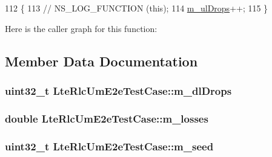 \begin{DoxyCode}
112 \{
113   \textcolor{comment}{// NS\_LOG\_FUNCTION (this);}
114   \hyperlink{classLteRlcUmE2eTestCase_aba1374edf326035c3804c471cbb844a0}{m\_ulDrops}++;
115 \}
\end{DoxyCode}


Here is the caller graph for this function\+:




\subsection{Member Data Documentation}
\subsubsection[{\texorpdfstring{m\+\_\+dl\+Drops}{m_dlDrops}}]{\setlength{\rightskip}{0pt plus 5cm}uint32\+\_\+t Lte\+Rlc\+Um\+E2e\+Test\+Case\+::m\+\_\+dl\+Drops\hspace{0.3cm}{\ttfamily [private]}}\hypertarget{classLteRlcUmE2eTestCase_a11acb19c786aa57d6ce8bdf86e75d79f}{}\label{classLteRlcUmE2eTestCase_a11acb19c786aa57d6ce8bdf86e75d79f}
\subsubsection[{\texorpdfstring{m\+\_\+losses}{m_losses}}]{\setlength{\rightskip}{0pt plus 5cm}double Lte\+Rlc\+Um\+E2e\+Test\+Case\+::m\+\_\+losses\hspace{0.3cm}{\ttfamily [private]}}\hypertarget{classLteRlcUmE2eTestCase_a1d6de8677532b47d1b7fd61d2081bb30}{}\label{classLteRlcUmE2eTestCase_a1d6de8677532b47d1b7fd61d2081bb30}
\subsubsection[{\texorpdfstring{m\+\_\+seed}{m_seed}}]{\setlength{\rightskip}{0pt plus 5cm}uint32\+\_\+t Lte\+Rlc\+Um\+E2e\+Test\+Case\+::m\+\_\+seed\hspace{0.3cm}{\ttfamily [private]}}\hypertarget{classLteRlcUmE2eTestCase_a4efdc34bf54ce1409c1176bdb5ee5d08}{}\label{classLteRlcUmE2eTestCase_a4efdc34bf54ce1409c1176bdb5ee5d08}
